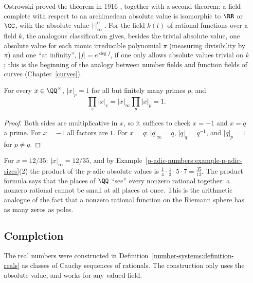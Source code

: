 \begin{remark}\label{p-adic-numbers:remark-ostrowski}
Ostrowski proved the theorem in 1916 \cite{ostrowski-1916}, together with a second theorem: a field complete with respect to an archimedean absolute value is isomorphic to $\RR$ or $\CC$, with
the absolute value $|\cdot|_\infty^\alpha$ \cite[Chapter 3]{cassels-local-fields}. For the field $k(t)$ of rational functions over a field $k$, the analogous classification gives, besides the
trivial absolute value, one absolute value for each monic irreducible polynomial $\pi$ (measuring divisibility by $\pi$) and one ``at infinity'', $|f| = e^{\deg f}$, if one only allows absolute values
trivial on $k$; this is the beginning of the analogy between number fields and function fields of curves (Chapter~\ref{curves}).
\end{remark}

\begin{theorem}\label{p-adic-numbers:theorem-product-formula}
For every $x \in \QQ^\times$, $|x|_p = 1$ for all but finitely many primes $p$, and
\[
\prod_{v}|x|_v = |x|_\infty\prod_p|x|_p = 1 .
\]
\end{theorem}

\begin{proof}
Both sides are multiplicative in $x$, so it suffices to check $x = -1$ and $x = q$ a prime. For $x = -1$ all factors are $1$. For $x = q$: $|q|_\infty = q$, $|q|_q = q^{-1}$, and $|q|_p = 1$ for
$p \neq q$.
\end{proof}

\begin{example}\label{p-adic-numbers:example-product-formula}
For $x = 12/35$: $|x|_\infty = 12/35$, and by Example~\ref{p-adic-numbers:example-p-adic-sizes}(2) the product of the $p$-adic absolute values is $\frac14 \cdot \frac13 \cdot 5 \cdot 7 = \frac{35}{12}$.
The product formula says that the places of $\QQ$ ``see'' every nonzero rational together: a nonzero rational cannot be small at all places at once. This is the arithmetic analogue of the fact
that a nonzero rational function on the Riemann sphere has as many zeros as poles.
\end{example}

\subsection{Completion}\label{p-adic-numbers:subsection-completion}

The real numbers were constructed in Definition~\ref{number-systems:definition-reals} as classes of Cauchy sequences of rationals. The construction only uses the absolute value, and works for any valued
field.

